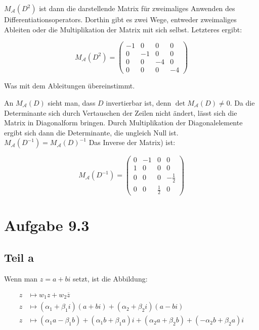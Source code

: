 \documentclass[a4paper,german,12pt,smallheadings]{scrartcl}
\begin{document}
$M_{\mathcal{A}}(D^2)$ ist dann die darstellende Matrix für zweimaliges
Anwenden des Differentiationsoperators. Dorthin gibt es zwei Wege, entweder
zweimaliges Ableiten oder die Multiplikation der Matrix mit sich selbst.
Letzteres ergibt:

\begin{equation}
  M_{\mathcal{A}}(D^2) = \begin{pmatrix}-1 & 0 & 0 & 0 \\ 0 & -1 & 0 & 0 \\ 0 & 0 & -4 & 0 \\ 0 & 0 & 0 & -4\end{pmatrix}
\end{equation}

Was mit dem Ableitungen übereinstimmt.

An $M_{\mathcal{A}}(D)$ sieht man, dass $D$ invertierbar ist, denn $\det
M_{\mathcal{A}}(D) \neq 0$. Da die Determinante sich durch Vertauschen der
Zeilen nicht ändert, lässt sich die Matrix in Diagonalform bringen. Durch
Multiplikation der Diagonalelemente ergibt sich dann die Determinante, die
ungleich Null ist. $M_{\mathcal{A}}(D^{-1}) = M_{\mathcal{A}}(D)^{-1}$  Das
Inverse der Matrix) ist:

\begin{equation}
  M_{\mathcal{A}}(D^{-1}) = \begin{pmatrix}0 & -1 & 0 & 0 \\ 1 & 0 & 0 & 0 \\ 0 & 0 & 0 & -\frac{1}{2} \\ 0 & 0 & \frac{1}{2} & 0\end{pmatrix}
\end{equation}

\section*{Aufgabe 9.3}
\subsection*{Teil a}
Wenn man $z = a+bi$ setzt, ist die Abbildung:

\begin{align*}
  z &\mapsto w_1z + w_2\overline{z} \\
  z &\mapsto (\alpha_1 + \beta_1i)(a+bi) + (\alpha_2+\beta_2i)(a-bi) \\
  z &\mapsto (\alpha_1a-\beta_1b) + (\alpha_1b + \beta_1a)i + (\alpha_2a+\beta_2b)+(-\alpha_2b+\beta_2a)i
\end{align*}
\end{document}
